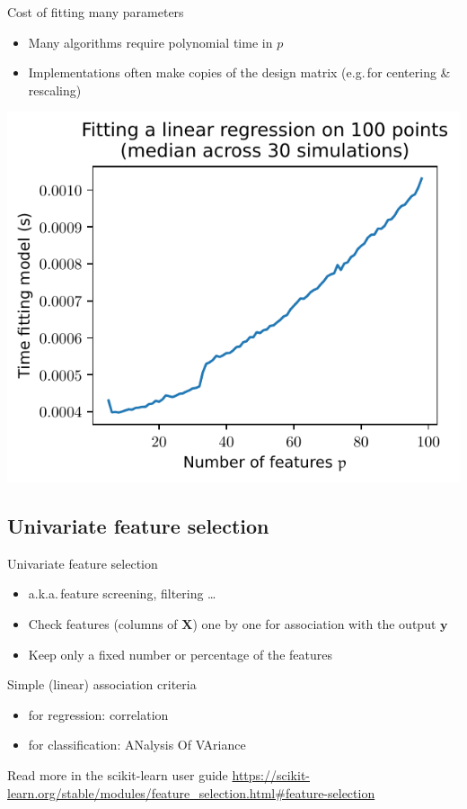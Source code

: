 \documentclass[presentation,mathserif,table]{beamer}
\newcommand{\eg}{e.g.\,}
\newcommand{\aka}{a.k.a.\,}
\newcommand{\X}{{\mathbold X}}
\newcommand{\y}{{\mathbold y}}
\begin{document}
\begin{frame}[label={sec:orgf365c26}]{Cost of fitting many parameters}
\begin{itemize}
\item Many algorithms require polynomial time in \(p\)
\item Implementations often make copies of the design matrix (\eg for centering \& rescaling)
\end{itemize}
\begin{center}
\includegraphics[height=.7\textheight]{figures/generated/ridge_overfitting/durations.pdf}
\end{center}
\end{frame}
\subsection{Univariate feature selection}
\label{sec:org985704a}
\begin{frame}[label={sec:org122101e}]{Univariate feature selection}
\begin{itemize}
\item \aka feature screening, filtering \ldots{}
\item Check features (columns of \(\X\)) one by one for association with the output \(\y\)
\item Keep only a fixed number or percentage of the features
\end{itemize}
\begin{block}{Simple (linear) association criteria}
\begin{itemize}
\item for regression: correlation
\item for classification: ANalysis Of VAriance
\end{itemize}
\end{block}
\begin{block}{Read more in the scikit-learn user guide}
\url{https://scikit-learn.org/stable/modules/feature\_selection.html\#feature-selection}
\end{block}
\end{frame}
\end{document}
